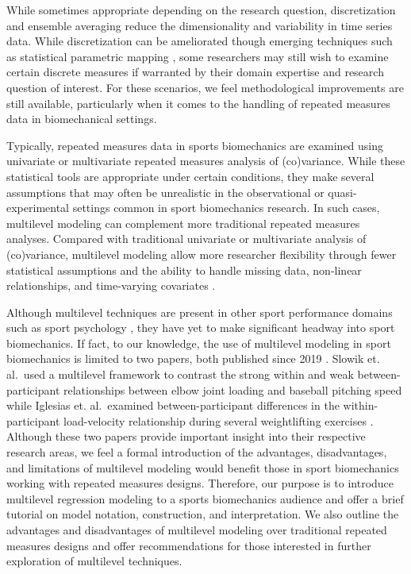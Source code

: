 \documentclass[
]{article}
\begin{document}
While sometimes appropriate depending on the research question, discretization and ensemble averaging reduce the dimensionality and variability in time series data. While discretization can be ameliorated though emerging techniques such as statistical parametric mapping \cite{pataky2019}, some researchers may still wish to examine certain discrete measures if warranted by their domain expertise and research question of interest. For these scenarios, we feel methodological improvements are still available, particularly when it comes to the handling of repeated measures data in biomechanical settings.

Typically, repeated measures data in sports biomechanics are examined using univariate or multivariate repeated measures analysis of (co)variance. While these statistical tools are appropriate under certain conditions, they make several assumptions that may often be unrealistic in the observational or quasi-experimental settings common in sport biomechanics research. In such cases, multilevel modeling can complement more traditional repeated measures analyses. Compared with traditional univariate or multivariate analysis of (co)variance, multilevel modeling allow more researcher flexibility through fewer statistical assumptions and the ability to handle missing data, non-linear relationships, and time-varying covariates \cite{hox2017}.

Although multilevel techniques are present in other sport performance domains such as sport psychology \cite{beauchamp2005,benson2016,cornelius2007}, they have yet to make significant headway into sport biomechanics. If fact, to our knowledge, the use of multilevel modeling in sport biomechanics is limited to two papers, both published since 2019 \cite{slowik2019, iglesias2021}. Slowik et. al.~used a multilevel framework to contrast the strong within and weak between-participant relationships between elbow joint loading and baseball pitching speed \cite{slowik2019} while Iglesias et. al.~examined between-participant differences in the within-participant load-velocity relationship during several weightlifting exercises \cite{iglesias2021}. Although these two papers provide important insight into their respective research areas, we feel a formal introduction of the advantages, disadvantages, and limitations of multilevel modeling would benefit those in sport biomechanics working with repeated measures designs. Therefore, our purpose is to introduce multilevel regression modeling to a sports biomechanics audience and offer a brief tutorial on model notation, construction, and interpretation. We also outline the advantages and disadvantages of multilevel modeling over traditional repeated measures designs and offer recommendations for those interested in further exploration of multilevel techniques.
\end{document}
